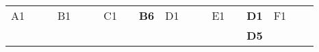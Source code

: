 \begin{landscape}
\begin{table}[h!]
\begin{tabular}{lcllcllcllcllcllcl}
\multicolumn{1}{|l|}{A1}  & \multicolumn{1}{c|}{}                                                                                                    & \multicolumn{1}{l|}{}        & \multicolumn{1}{l|}{\cellcolor[HTML]{C0C0C0}B1} & \multicolumn{1}{c|}{\cellcolor[HTML]{C0C0C0}}                                                                                                       & \multicolumn{1}{l|}{\cellcolor[HTML]{C0C0C0}}         & \multicolumn{1}{l|}{C1} & \multicolumn{1}{c|}{}                                                                                                    & \multicolumn{1}{l|}{{\bf B6}} & \multicolumn{1}{l|}{\cellcolor[HTML]{C0C0C0}D1} & \multicolumn{1}{c|}{\cellcolor[HTML]{C0C0C0}}                                                                                             & \multicolumn{1}{l|}{\cellcolor[HTML]{C0C0C0}{\bf C1}} & \multicolumn{1}{l|}{E1} & \multicolumn{1}{c|}{}                                                                                                               & \multicolumn{1}{l|}{{\bf D1}} & \multicolumn{1}{l|}{\cellcolor[HTML]{C0C0C0}F1} & \multicolumn{1}{c|}{\cellcolor[HTML]{C0C0C0}}                                                                                                         & \multicolumn{1}{l|}{\cellcolor[HTML]{C0C0C0}{\bf D4}} \\ \cline{1-1} \cline{3-4} \cline{6-7} \cline{9-10} \cline{12-13} \cline{15-16} \cline{18-18} 
\multicolumn{1}{l|}{}     & \multicolumn{1}{c|}{}                                                                                                    &                              & \multicolumn{1}{l|}{\cellcolor[HTML]{C0C0C0}}   & \multicolumn{1}{c|}{\cellcolor[HTML]{C0C0C0}}                                                                                                       & \cellcolor[HTML]{C0C0C0}                              & \multicolumn{1}{l|}{}   & \multicolumn{1}{c|}{}                                                                                                    &                               & \multicolumn{1}{l|}{\cellcolor[HTML]{C0C0C0}}   & \multicolumn{1}{c|}{\cellcolor[HTML]{C0C0C0}}                                                                                             & \cellcolor[HTML]{C0C0C0}{\bf C2}                      & \multicolumn{1}{l|}{}   & \multicolumn{1}{c|}{}                                                                                                               & {\bf D5}                      & \multicolumn{1}{l|}{\cellcolor[HTML]{C0C0C0}}   & \multicolumn{1}{c|}{\cellcolor[HTML]{C0C0C0}}                                                                                                         & \cellcolor[HTML]{C0C0C0}                              \\

\end{tabular}
\end{table}
\end{landscape}
